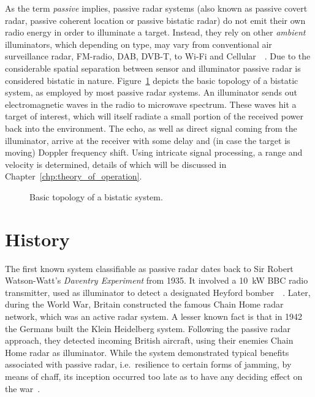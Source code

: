 As the term \emph{passive} implies, passive radar systems (also known as passive covert radar, passive coherent location or passive bistatic radar) do not emit their own radio energy in order to illuminate a target. Instead, they rely on other \emph{ambient} illuminators, which depending on type, may vary from conventional air surveillance radar, FM-radio, DAB, DVB-T, to Wi-Fi and Cellular~\cite[pp.~48--77]{Malanowski2019}\ \cite{Kuschel2013}. Due to the considerable spatial separation between sensor and illuminator passive radar is considered bistatic in nature. Figure~\ref{fig:topology} depicts the basic topology of a bistatic system, as employed by most passive radar systems. An illuminator sends out electromagnetic waves in the radio to microwave spectrum. These waves hit a target of interest, which will itself radiate a small portion of the received power back into the environment. The echo, as well as direct signal coming from the illuminator, arrive at the receiver with some delay and (in case the target is moving) Doppler frequency shift. Using intricate signal processing, a range and velocity is determined, details of which will be discussed in Chapter~\ref{chp:theory_of_operation}.

\begin{figure}
    \centering
    \begin{tikzpicture}
        
    \end{tikzpicture}
    \caption{Basic topology of a bistatic system.}\label{fig:topology}
\end{figure}

\section{History}

The first known system classifiable as passive radar dates back to Sir Robert Watson-Watt's \emph{Daventry Experiment} from 1935. It involved a \SI{10}{\kilo\watt} BBC radio transmitter, used as illuminator to detect a designated Heyford bomber~\cite[pp.~5--6]{Malanowski2019}~\cite{Kuschel2013}. Later, during the  World War, Britain constructed the famous Chain Home radar network, which was an active radar system. A lesser known fact is that in 1942 the Germans built the Klein Heidelberg system. Following the passive radar approach, they detected incoming British aircraft, using their enemies Chain Home radar as illuminator. While the system demonstrated typical benefits associated with passive radar, i.e.\ resilience to certain forms of jamming, by means of chaff, its inception occurred too late as to have any deciding effect on the war~\cite{Griffiths2010}.

